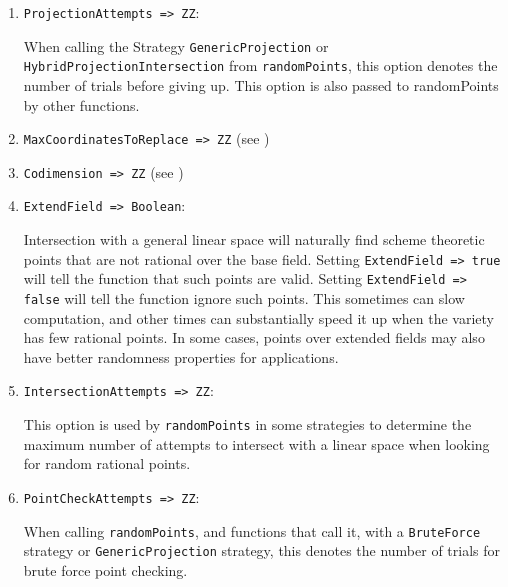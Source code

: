 \documentclass[11pt]{amsart}
\theoremstyle{definition}
\newtheorem{example}{Example}[section]
\begin{document}
\begin{enumerate}
\begin{example}
{{\begin{verbatim}
o3 = {}

o3 : List

i4 : randomPoints(J,Strategy=>GenericProjection)

o4 = {{45, -28, -20}}

o4 : List
\end{verbatim}
}}
\end{example}
	
\item {\tt ProjectionAttempts => ZZ}: 

When calling the Strategy {\tt GenericProjection} or {\tt HybridProjectionIntersection} from {\tt randomPoints}, this option denotes the number of trials before giving up.  This option is also passed to randomPoints by other functions.


\item {\tt MaxCoordinatesToReplace => ZZ} (see )

\vspace{1em}
\item {\tt Codimension => ZZ} (see )

\vspace{1em}
\item {\tt ExtendField => Boolean}: 

Intersection with a general linear space will naturally find scheme theoretic points that are not rational over the base field.  
Setting {\tt ExtendField => true} will tell the function that such points are valid.  Setting {\tt ExtendField => false} will tell the function ignore such points.  This sometimes can slow computation, and other times can substantially speed it up when the variety has few rational points.  In some cases, points over extended fields may also have better randomness properties for applications.

\vspace{1em}
\item {\tt IntersectionAttempts => ZZ}: 

This option is used by {\tt randomPoints} in some strategies to determine the maximum number of attempts to intersect with a linear space when looking for random rational points.  %

\vspace{1em}
\item{\tt PointCheckAttempts => ZZ}:

 When calling {\tt randomPoints}, and functions that call it, with a {\tt BruteForce} strategy or {\tt GenericProjection} strategy, this denotes the number of trials for brute force point checking.
 

\end{enumerate}
\end{document}
